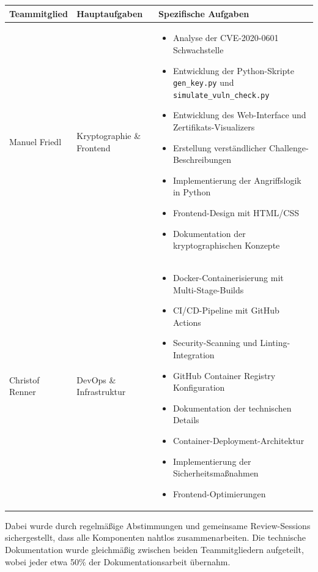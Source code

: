 \documentclass{article}
\begin{document}
\begin{longtable}{|p{3cm}|p{5cm}|p{6cm}|}
    \hline
    \textbf{Teammitglied} & \textbf{Hauptaufgaben} & \textbf{Spezifische Aufgaben} \\
    \hline
    \endhead

    Manuel Friedl & Kryptographie \& Frontend & 
    \begin{itemize}
      \item Analyse der CVE-2020-0601 Schwachstelle
      \item Entwicklung der Python-Skripte \texttt{gen\_key.py} und \texttt{simulate\_vuln\_check.py}
      \item Entwicklung des Web-Interface und Zertifikats-Visualizers
      \item Erstellung verständlicher Challenge-Beschreibungen
      \item Implementierung der Angriffslogik in Python
      \item Frontend-Design mit HTML/CSS
      \item Dokumentation der kryptographischen Konzepte
    \end{itemize} \\
    \hline

    Christof Renner & DevOps \& Infrastruktur & 
    \begin{itemize}
      \item Docker-Containerisierung mit Multi-Stage-Builds
      \item CI/CD-Pipeline mit GitHub Actions
      \item Security-Scanning und Linting-Integration
      \item GitHub Container Registry Konfiguration
      \item Dokumentation der technischen Details
      \item Container-Deployment-Architektur
      \item Implementierung der Sicherheitsmaßnahmen
      \item Frontend-Optimierungen
    \end{itemize} \\
    \hline
    \end{longtable}

\noindent Dabei wurde durch regelmäßige Abstimmungen und gemeinsame Review-Sessions sichergestellt, dass alle Komponenten nahtlos zusammenarbeiten. Die technische Dokumentation wurde gleichmäßig zwischen beiden Teammitgliedern aufgeteilt, wobei jeder etwa 50\% der Dokumentationsarbeit übernahm.
\end{document}
